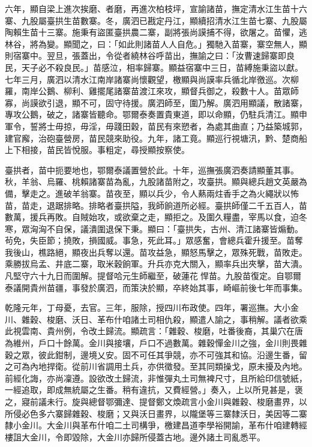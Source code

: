 \begin{pinyinscope}
六年，顯自梁上進次挨磨、者磨，再進次柏枝坪，宣諭諸苗，撫定清水江生苗十六寨、九股屬臺拱生苗數寨。冬，廣泗已戡定丹江，顯續招清水江生苗七寨、九股屬陶賴生苗十三寨。施秉有盜匿臺拱農二寨，副將張尚謨捕不得，欲屠之。苗懼，逃林谷，將為變。顯聞之，曰：「如此則諸苗人人自危。」獨馳入苗寨，寨空無人，顯則宿寨中。翌旦，張蓋出，令從者繞林谷呼苗出，撫諭之曰：「汝曹速歸寨即良民，天子必不殺良民。」苗感泣，相率歸寨。顯益宿寨中三日，苗縛施秉盜以獻。七年三月，廣泗以清水江南岸諸寨尚懷觀望，檄顯與尚謨率兵循北岸徼巡。次柳羅，南岸公鵝、柳利、雞擺尾諸寨苗渡江來攻，顯督兵御之，殺數十人。苗眾師寡，尚謨欲引退，顯不可，固守待援。廣泗師至，圍乃解。廣泗用顯議，散諸寨，專攻公鵝，破之，諸寨皆聽命。鄂爾泰奏置貴東道，即以命顯，仍駐兵清江。顯申軍令，誓將士毋掠，毋淫，毋踐田穀，苗民有來愬者，為處其曲直；乃益築城郭，建官廨，治砲臺營房，苗民競來助役。九年，諸工竟。顯巡行視塘汛，黔、楚商船上下相接，苗民皆悅服。事粗定，尋授顯按察使。

臺拱者，苗中扼要地也，鄂爾泰議置營於此。十年，巡撫張廣泗奏請顯董其事。秋，羊翁、烏羅、桃賴諸寨苗為亂，九股諸苗附之，攻臺拱。顯與總兵趙文英嚴為備，擊走之。進破羊翁寨。苗夜至，顯以兵少，令人爇兩炷香手之為火繩狀以怖苗，苗走，退踞排略。排略者臺拱隘，我師餉道所必經。臺拱師僅二千五百人，苗數萬，援兵再敗。自賊始攻，或欲棄之走，顯拒之。及圍久糧盡，宰馬以食，迫冬寒，眾洶洶不自保，議潰圍退保下秉。顯曰：「臺拱失，古州、清江諸寨皆煽動。茍免，失臣節；撓敗，損國威。事急，死此耳。」眾感奮，會總兵霍升援至。苗奪我後山，樵路絕，顯夜出兵奪以還。苗攻益急，顯怒馬擊之，眾殊死戰，苗敗走。乘勝拔烏孟、井底二寨，取米穀餉軍。升兵亦克大關入，顯率兵出夾擊，苗大潰。凡堅守六十九日而圍解。提督哈元生師繼至，破蓮花悍苗。九股苗復定。自鄂爾泰議開貴州苗疆，事發於廣泗，而策決於顯，卒終始其事，崎嶇前後七年而事集。

乾隆元年，丁母憂，去官。三年，服除，授四川布政使。四年，署巡撫。大小金川、雜穀、梭磨、沃日、革布什咱諸土司相仇殺，顯遣人諭之，事稍解。議者欲乘此視雲南、貴州例，令改土歸流。顯疏言：「雜穀、梭磨，吐番後裔，其巢穴在唐為維州，戶口十餘萬。金川與接壤，戶口不過數萬。雜穀憚金川之強，金川則畏雜穀之眾，彼此鉗制，邊境乂安。固不可任其爭競，亦不可強其和協。沿邊生番，留之可為內地捍衛。從前川省調用土兵，亦供徵發。至其同類操戈，原未擾及內地。前經化誨，亦尚凜遵。設欲改土歸流，非惟彈丸土司無裨尺寸，且所給印信號紙，一經追取，即成無統屬之生番。稍有違抗，又費經營。」奏入，上以所見甚是，褒之，寢前議未行。旋與總督鄂彌達、提督鄭文煥疏言小金川與雜穀、梭磨畫界，以所侵必色多六寨歸雜穀、梭磨；又與沃日畫界，以隴堡等三寨隸沃日，美因等二寨隸小金川。大金川與革布什咱二土司構爭，檄建昌道李學裕開諭，革布什咱建轉經樓詛大金川，令即毀除，大金川亦歸所侵蓋古地。邊外諸土司亂悉平。


\end{pinyinscope}
